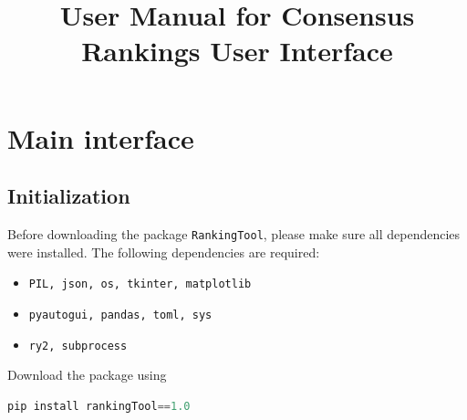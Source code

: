 \documentclass[a4paper,11pt]{memoir}
\title{User Manual for Consensus Rankings User Interface}
\date{}
\makeatletter
\def\maketitle{%
  \null
  \thispagestyle{empty}%
  \vfill
  \begin{center}\leavevmode
    \normalfont
    {\LARGE\raggedleft \@author\par}%
    \hrulefill\par
    {\huge\raggedright \@title\par}%
    \vskip 1cm
  \end{center}%
  \vfill
  \null
  \cleardoublepage
  }
\makeatother
\begin{document}
\let\cleardoublepage\clearpage

\maketitle


\tableofcontents

\clearpage

\chapter{Main interface}
\section{Initialization}

Before downloading the package \texttt{RankingTool}, 
please make sure all dependencies were installed.
The following dependencies are required:
\begin{itemize}
  \item \texttt{PIL, json, os, tkinter, matplotlib}
  \item \texttt{pyautogui, pandas, toml, sys}
  \item \texttt{ry2, subprocess}
\end{itemize}

Download the package using
\begin{lstlisting}[language=Python]
		pip install rankingTool==1.0
\end{lstlisting}
\end{document}

